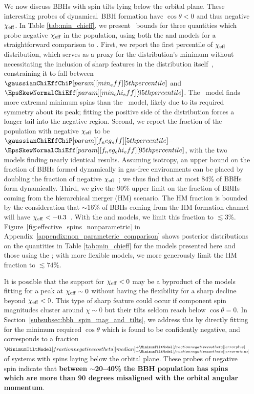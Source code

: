 We now discuss \acp{BBH} with spin tilts lying below the orbital plane. 
These interesting probes of dynamical~\ac{BBH} formation have $\cos\theta<0$ and thus negative $\chi_{\rm eff}$.
In Table \ref{tab:min_chieff}, we present \confidenceLevel~bounds for three quantities which probe negative $\chi_{\rm eff}$ in the population, using both the \skewnormalChiEff and \effectiveSpinModel models for a straightforward comparison to \gwtcthree.
First, we report the first percentile of $\chi_{\rm eff}$ distribution, which serves as a proxy for the distribution's minimum without necessitating the inclusion of sharp features in the distribution itself~\citep{Callister:2022qwb}, constraining it to fall between $\gaussianChiEffChiP[param][min_eff][5th percentile]$ and $\EpsSkewNormalChiEff[param][min_chi_eff][95th percentile]$.
The \effectiveSpinModel~model finds more extremal minimum spins than the \skewnormalChiEff~model, likely due to its required symmetry about its peak; fitting the positive side of the distribution forces a longer tail into the negative region.
Second, we report the fraction of the population with negative $\chi_{\rm eff}$ to be $\gaussianChiEffChiP[param][f_neg_eff][5th percentile]$--$\EpsSkewNormalChiEff[param][f_neg_chi_eff][95th percentile]$, with the two models finding nearly identical results. 
Assuming isotropy, an upper bound on the fraction of \acp{BBH} formed dynamically in gas-free environments can be placed by doubling the fraction of negative $\chi_{\rm eff}$~\citep[Equation 7 of][]{LIGOScientific:2020kqk}; we thus find that at most $84\%$ of \acp{BBH} form dynamically. 
Third, we give the 90\% upper limit on the fraction of \acp{BBH} coming from the hierarchical merger (HM) scenario. 
The HM fraction is bounded by the consideration that $\sim 16\%$ of \acp{BBH} coming from the HM formation channel will have $\chi_{\rm eff} < -0.3$~\citep{Baibhav:2020xdf,Fishbach:2022lzq}. With the \skewnormalChiEff and \effectiveSpinModel models, we limit this fraction to $\lesssim 3\%$.
Figure~\ref{fig:effective_spins_nonparametric} in Appendix~\ref{appendix:non_parameteric_comparison} shows posterior distributions on the quantities in Table \ref{tab:min_chieff} for the models presented here and those using the \nonparametric; with more flexible models, we more generously limit the HM fraction to $\lesssim 74\%$.

It is possible that the support for $\chi_{\rm eff} < 0$ may be a byproduct of the models fitting for a peak at $\chi_{\rm eff}\sim 0$ without having the flexibility for a sharp decline beyond $\chi_{\rm eff} < 0$.
This type of sharp feature could occur if component spin magnitudes cluster around $\chi\sim 0$ but their tilts seldom reach below $\cos\theta=0$. 
In Section~\ref{subsubsec:bbh_spin_mag_and_tilts}, we address this by directly fitting for the minimum required $\cos\theta$ which is found to be confidently negative, and corresponds to a fraction $\CIPlusMinus{\MinimumTiltModel[fraction negative cos theta]}$ of systems with spins laying below the orbital plane.
These probes of negative spin indicate that \textbf{between $\sim$20--40\% the BBH population has spins which are more than 90 degrees misaligned with the orbital angular momentum}.

